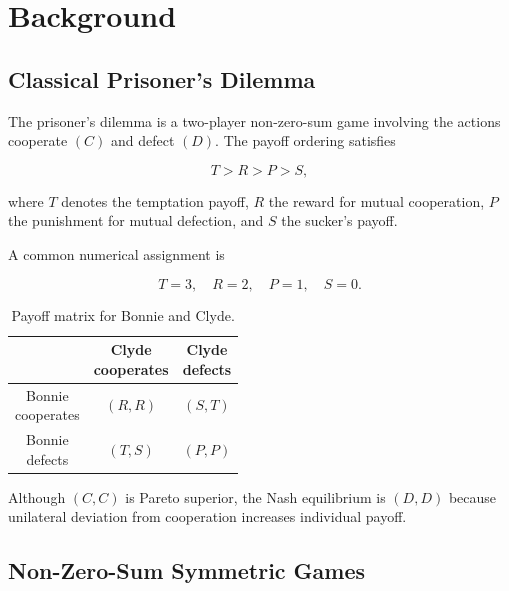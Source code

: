\section{Background}

\subsection{Classical Prisoner's Dilemma}

The prisoner's dilemma is a two-player non-zero-sum game involving the actions cooperate $(C)$ and defect $(D)$. The payoff ordering satisfies

\begin{equation}
	T > R > P > S,
\end{equation}

where $T$ denotes the temptation payoff, $R$ the reward for mutual cooperation, $P$ the punishment for mutual defection, and $S$ the sucker's payoff.

A common numerical assignment is

\begin{equation}
	T = 3,\quad R = 2,\quad P = 1,\quad S = 0.
\end{equation}

\begin{table}[H]
	\centering
	\caption{Payoff matrix for Bonnie and Clyde.}
	\label{tab:prisoners}
	
	\renewcommand{\arraystretch}{2.5}
	\setlength{\tabcolsep}{8pt}
	
	\begin{tabular}{c|c|c}
		& \shortstack{Clyde\\cooperates}
		& \shortstack{Clyde\\defects} \\
		\hline
		\shortstack{Bonnie\\cooperates}
		& $(R,R)$
		& $(S,T)$ \\
		\hline
		\shortstack{Bonnie\\defects}
		& $(T,S)$
		& $(P,P)$
	\end{tabular}
\end{table}

Although $(C,C)$ is Pareto superior, the Nash equilibrium is $(D,D)$ because unilateral deviation from cooperation increases individual payoff.

\subsection{Non-Zero-Sum Symmetric Games}

